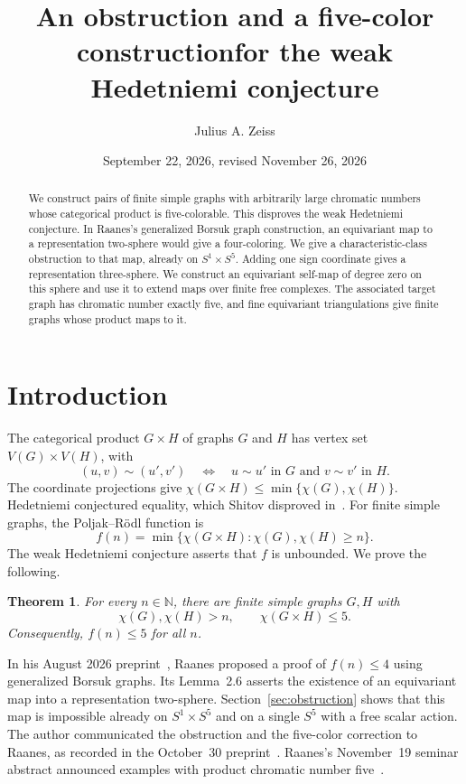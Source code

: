 \documentclass[11pt]{amsart}
\title[An obstruction and a five-color construction]{An obstruction and a five-color construction\newline for the weak Hedetniemi conjecture}
\author{Julius A. Zeiss}
\date{September 22, 2026, revised November 26, 2026}
\newtheorem{theorem}{Theorem}[section]
\theoremstyle{definition}
\theoremstyle{remark}
\numberwithin{equation}{section}
\newcommand{\N}{\mathbb N}
\begin{document}
\begin{abstract}
We construct pairs of finite simple graphs with arbitrarily large chromatic numbers whose categorical product is five-colorable. This disproves the weak Hedetniemi conjecture. In Raanes's generalized Borsuk graph construction, an equivariant map to a representation two-sphere would give a four-coloring. We give a characteristic-class obstruction to that map, already on $S^1\times S^5$. Adding one sign coordinate gives a representation three-sphere. We construct an equivariant self-map of degree zero on this sphere and use it to extend maps over finite free complexes. The associated target graph has chromatic number exactly five, and fine equivariant triangulations give finite graphs whose product maps to it.
\end{abstract}
\maketitle

\section{Introduction}

The categorical product $G\times H$ of graphs $G$ and $H$ has vertex set $V(G)\times V(H)$, with
\[
 (u,v)\sim(u',v')\quad\Longleftrightarrow\quad
 u\sim u'\text{ in }G\text{ and }v\sim v'\text{ in }H.
\]
The coordinate projections give $\chi(G\times H)\leq\min\{\chi(G),\chi(H)\}$. Hedetniemi conjectured equality, which Shitov disproved in~\cite{Shitov}. For finite simple graphs, the Poljak--R\"odl function is
\[
 f(n)=\min\{\chi(G\times H):\chi(G),\chi(H)\geq n\}.
\]
The weak Hedetniemi conjecture asserts that $f$ is unbounded. We prove the following.

\begin{theorem}\label{thm:main}
For every $n\in\N$, there are finite simple graphs $G,H$ with
\[
 \chi(G),\chi(H)>n,
 \qquad \chi(G\times H)\leq5.
\]
Consequently, $f(n)\leq5$ for all $n$.
\end{theorem}

In his August 2026 preprint~\cite{Raanes}, Raanes proposed a proof of $f(n)\leq4$ using generalized Borsuk graphs. Its Lemma~2.6 asserts the existence of an equivariant map into a representation two-sphere. Section~\ref{sec:obstruction} shows that this map is impossible already on $S^1\times S^5$ and on a single $S^5$ with a free scalar action. The author communicated the obstruction and the five-color correction to Raanes, as recorded in the October~30 preprint~\cite[\S3.1, footnote~2]{ZeissOR}. Raanes's November~19 seminar abstract announced examples with product chromatic number five~\cite{RaanesSeminar}.
\end{document}

